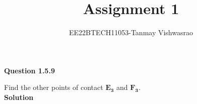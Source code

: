 \documentclass[journal,12pt,twocolumn]{IEEEtran}
\theoremstyle{remark}
\begin{document}
\let\vec\mathbf





\vspace{3cm}

\title{
Assignment 1
}
\author{ EE22BTECH11053-Tanmay Vishwasrao%
	
}	

\maketitle

\newpage


\bigskip

\renewcommand{\thefigure}{\theenumi}
\renewcommand{\thetable}{\theenumi}
\textbf{Question 1.5.9}

Find the other points of contact $\vec{E_3}$ and $\vec{F_3}$.\\

\textbf{Solution} 
\end{document}
